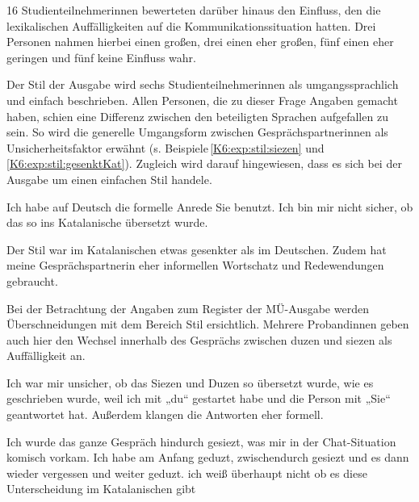 16 Studienteilnehmer{\textperiodcentered}innen bewerteten darüber hinaus den Einfluss, den die lexikalischen Auffälligkeiten auf die Kommunikationssituation hatten. Drei Personen nahmen hierbei einen großen, drei einen eher großen, fünf einen eher geringen und fünf keine Einfluss wahr. 
	
Der Stil der Ausgabe wird sechs Studienteilnehmer{\textperiodcentered}innen als umgangssprachlich und einfach beschrieben. Allen Personen, die zu dieser Frage Angaben gemacht haben, schien eine Differenz zwischen den beteiligten Sprachen aufgefallen zu sein. So wird die generelle Umgangsform zwischen Gesprächspartner{\textperiodcentered}\linebreak[3]innen als Unsicherheitsfaktor erwähnt (s. Beispiele\,\ref{K6:exp:stil:siezen} und \ref{K6:exp:stil:gesenktKat}). Zugleich wird darauf hingewiesen, dass es sich bei der Ausgabe um einen einfachen Stil handele.

\begin{example}
	\label{K6:exp:stil:siezen}
	Ich habe auf Deutsch die formelle Anrede \glqq Sie\grqq{} benutzt. Ich bin mir nicht sicher, ob das so ins Katalanische übersetzt wurde. 
\end{example}	

\begin{example}
	\label{K6:exp:stil:gesenktKat}
	Der Stil war im Katalanischen etwas gesenkter als im Deutschen. Zudem hat meine Gesprächspartnerin eher informellen Wortschatz und Redewendungen gebraucht.
\end{example}

Bei der Betrachtung der Angaben zum Register der MÜ-Ausgabe werden Überschneidungen mit dem Bereich Stil ersichtlich. Mehrere Proband{\textperiodcentered}innen geben auch hier den Wechsel innerhalb des Gesprächs zwischen duzen und siezen als Auffälligkeit an. 

\begin{example}
	\label{K6:exp:register:siezenduzen}
	Ich war mir unsicher, ob das Siezen und Duzen so übersetzt wurde, wie es geschrieben wurde, weil ich mit „du“ gestartet habe und die Person mit „Sie“ geantwortet hat. Außerdem klangen die Antworten eher formell.
\end{example}

\begin{example}
	\label{K6:exp:register:siezenduzen2}
	Ich wurde das ganze Gespräch hindurch gesiezt, was mir in der Chat-Situation komisch vorkam. Ich habe am Anfang geduzt, zwischendurch gesiezt und es dann wieder vergessen und weiter geduzt. ich weiß überhaupt nicht ob es diese Unterscheidung im Katalanischen gibt
\end{example}

